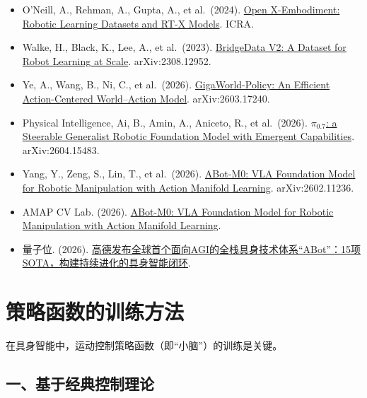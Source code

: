 \begin{itemize}
\tightlist
\item
  O'Neill, A., Rehman, A., Gupta, A., et al.~(2024). \href{https://arxiv.org/abs/2310.08864}{Open X-Embodiment: Robotic Learning Datasets and RT-X Models}. ICRA.
\item
  Walke, H., Black, K., Lee, A., et al.~(2023). \href{https://arxiv.org/abs/2308.12952}{BridgeData V2: A Dataset for Robot Learning at Scale}. arXiv:2308.12952.
\item
  Ye, A., Wang, B., Ni, C., et al.~(2026). \href{https://arxiv.org/abs/2603.17240}{GigaWorld-Policy: An Efficient Action-Centered World--Action Model}. arXiv:2603.17240.
\item
  Physical Intelligence, Ai, B., Amin, A., Aniceto, R., et al.~(2026). \href{https://arxiv.org/abs/2604.15483}{\(\pi_{0.7}\): a Steerable Generalist Robotic Foundation Model with Emergent Capabilities}. arXiv:2604.15483.
\item
  Yang, Y., Zeng, S., Lin, T., et al.~(2026). \href{https://arxiv.org/abs/2602.11236}{ABot-M0: VLA Foundation Model for Robotic Manipulation with Action Manifold Learning}. arXiv:2602.11236.
\item
  AMAP CV Lab. (2026). \href{https://amap-cvlab.github.io/ABot-Manipulation/}{ABot-M0: VLA Foundation Model for Robotic Manipulation with Action Manifold Learning}.
\item
  量子位. (2026). \href{https://www.traeai.com/articles/e175141a-e8b5-4e06-a589-42bd432aa115}{高德发布全球首个面向AGI的全栈具身技术体系``ABot''：15项SOTA，构建持续进化的具身智能闭环}.
\end{itemize}

\clearpage

\hypertarget{ux7b56ux7565ux51fdux6570ux7684ux8badux7ec3ux65b9ux6cd5}{%
\section{策略函数的训练方法}\label{ux7b56ux7565ux51fdux6570ux7684ux8badux7ec3ux65b9ux6cd5}}

在具身智能中，运动控制策略函数（即``小脑''）的训练是关键。

\hypertarget{ux4e00ux57faux4e8eux7ecfux5178ux63a7ux5236ux7406ux8bba}{%
\subsection{一、基于经典控制理论}\label{ux4e00ux57faux4e8eux7ecfux5178ux63a7ux5236ux7406ux8bba}}

